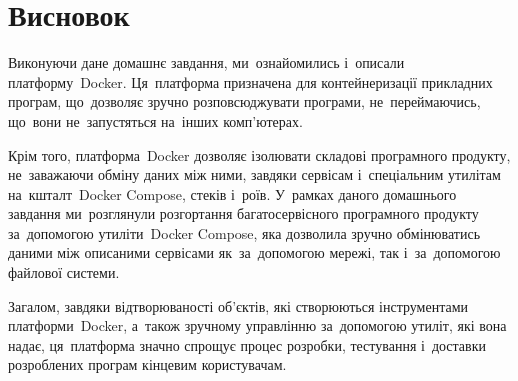 \documentclass[
	a4paper,
	oneside,
	BCOR = 10mm,
	DIV = 12,
	12pt,
	headings = normal,
]{scrartcl}
\begin{document}
			\section{Висновок}
				Виконуючи дане домашнє завдання, ми~ознайомились і~описали платформу~\textenglish{Docker}. Ця~платформа призначена для контейнеризації прикладних програм, що~дозволяє зручно розповсюджувати програми, не~переймаючись, що~вони не~запустяться на~інших комп'ютерах.

				Крім того, платформа~\textenglish{Docker} дозволяє ізолювати складові програмного продукту, не~заважаючи обміну даних між ними, завдяки сервісам і~спеціальним утилітам на~кшталт~\textenglish{Docker Compose}, стеків і~роїв. У~рамках даного домашнього завдання ми~розглянули розгортання багатосервісного програмного продукту за~допомогою утиліти~\textenglish{Docker Compose}, яка дозволила зручно обмінюватись даними між описаними сервісами як~за~допомогою мережі, так і~за~допомогою файлової системи.

				Загалом, завдяки відтворюваності об'єктів, які створюються інструментами платформи~\textenglish{Docker}, а~також зручному управлінню за~допомогою утиліт, які вона надає, ця~платформа значно спрощує процес розробки, тестування і~доставки розроблених програм кінцевим користувачам.
\end{document}
